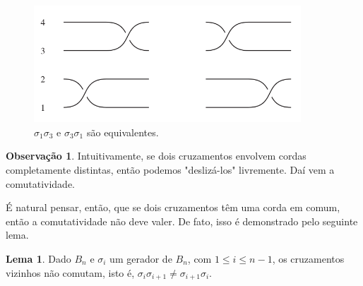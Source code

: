 \documentclass[a4paper,portuguese,11pt,twoside, leqno]{book}
\theoremstyle{definition}
\newtheorem{lemma}[theorem]{Lema}
\newtheorem{remark}{Observação}[section]
\begin{document}
	\begin{figure}[H]
		\captionsetup{justification=centering}
		\begin{center}
			\includegraphics[width=10cm]{comutatividade.png}
		\end{center}\caption{$\sigma_1\sigma_3$ e $\sigma_3\sigma_1$ são equivalentes.}\label{comutatividade de trancas}
	\end{figure}
	
	\par\vspace{0.3cm}
	
	\begin{remark}
		Intuitivamente, se dois cruzamentos envolvem cordas completamente distintas, então podemos "deslizá-los" livremente. Daí vem a comutatividade.
	\end{remark}
	
	\par\vspace{0.3cm} É natural pensar, então, que se dois cruzamentos têm uma corda em comum, então a comutatividade não deve valer. De fato, isso é demonstrado pelo seguinte lema.
	
	\begin{lemma}
		\label{vizinhos nao comutam}
		Dado $B_n$ e $\sigma_i$ um gerador de $B_n$, com $1\leq i\leq n-1$, os cruzamentos vizinhos não comutam, isto é, $\sigma_i\sigma_{i+1}\neq\sigma_{i+1}\sigma_i$.
	\end{lemma}
	
\end{document}
